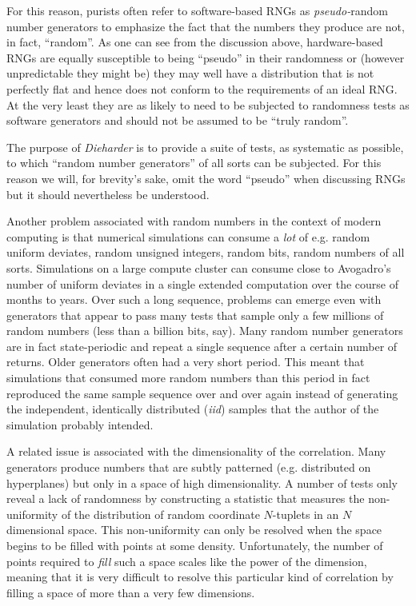 \documentclass{book}
\begin{document}
For this reason, purists often refer to software-based RNGs as {\em
pseudo-}random number generators to emphasize the fact that the numbers
they produce are not, in fact, ``random''.  As one can see from the
discussion above, hardware-based RNGs are equally susceptible to being
``pseudo'' in their randomness or (however unpredictable they might be)
they may well have a distribution that is not perfectly flat and hence
does not conform to the requirements of an ideal RNG.  At the very least
they are as likely to need to be subjected to randomness tests as
software generators and should not be assumed to be ``truly random''.

The purpose of {\em Dieharder} is to provide a suite of tests, as
systematic as possible, to which ``random number generators'' of all
sorts can be subjected.  For this reason we will, for brevity's sake,
omit the word ``pseudo'' when discussing RNGs but it should nevertheless
be understood.

Another problem associated with random numbers in the context of modern
computing is that numerical simulations can consume a {\em lot} of e.g.
random uniform deviates, random unsigned integers, random bits, random
numbers of all sorts.  Simulations on a large compute cluster can
consume close to Avogadro's number of uniform deviates in a single
extended computation over the course of months to years.  Over such a
long sequence, problems can emerge even with generators that appear to
pass many tests that sample only a few millions of random numbers (less
than a billion bits, say).  Many random number generators are in fact
state-periodic and repeat a single sequence after a certain number of
returns.  Older generators often had a very short period.  This meant
that simulations that consumed more random numbers than this period in
fact reproduced the same sample sequence over and over again instead of
generating the independent, identically distributed ({\em iid}) samples
that the author of the simulation probably intended.

A related issue is associated with the dimensionality of the
correlation.  Many generators produce numbers that are subtly patterned
(e.g. distributed on hyperplanes) but only in a space of high
dimensionality.  A number of tests only reveal a lack of randomness by
constructing a statistic that measures the non-uniformity of the
distribution of random coordinate $N$-tuplets in an $N$ dimensional
space.  This non-uniformity can only be resolved when the space begins
to be filled with points at some density.  Unfortunately, the number of
points required to {\em fill} such a space scales like the power of the
dimension, meaning that it is very difficult to resolve this particular
kind of correlation by filling a space of more than a very few
dimensions.
\end{document}
